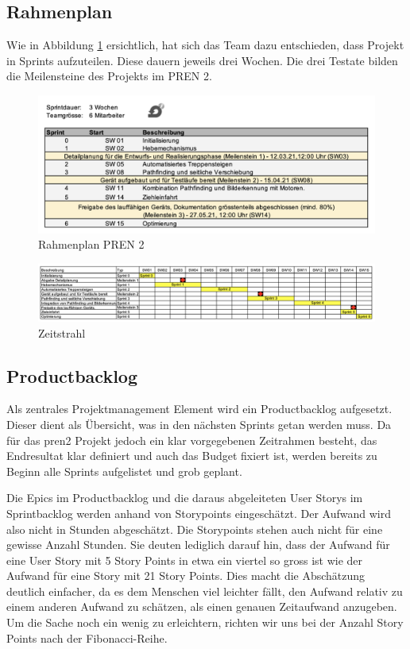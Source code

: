 \newpage
  
\subsection{Rahmenplan}
Wie in Abbildung \ref{fig:rahmenplan} ersichtlich, hat sich das Team dazu entschieden, dass Projekt in Sprints aufzuteilen. Diese dauern jeweils drei Wochen. Die drei Testate bilden die Meilensteine des Projekts im PREN 2.

\begin{figure}[H]
  \includegraphics[width=1.0\textwidth]{img/projektmanagement/Rahmenplan PREN2.png}
  \centering
  \caption{Rahmenplan PREN 2}
  \label{fig:rahmenplan}
\end{figure}

\begin{figure}[H]
  \includegraphics[width=1.0\textwidth]{img/projektmanagement/Zeitstrahl.png}
  \centering
  \caption{Zeitstrahl}
  \label{fig:sprint-backlog-1}
\end{figure}

\newpage

\subsection{Productbacklog}
Als zentrales Projektmanagement Element wird ein Productbacklog aufgesetzt. Dieser dient als Übersicht, was in den nächsten Sprints getan werden muss. Da für das \acrshort{pren2} Projekt jedoch ein klar vorgegebenen Zeitrahmen besteht, das Endresultat klar definiert und auch das Budget fixiert ist, werden bereits zu Beginn alle Sprints aufgelistet und grob geplant. 

Die Epics im Productbacklog und die daraus abgeleiteten User Storys im Sprintbacklog werden anhand von Storypoints eingeschätzt. Der Aufwand wird also nicht in Stunden abgeschätzt. Die Storypoints stehen auch nicht für eine gewisse Anzahl Stunden. Sie deuten lediglich darauf hin, dass der Aufwand für eine User Story mit 5 Story Points in etwa ein viertel so gross ist wie der Aufwand für eine Story mit 21 Story Points. Dies macht die Abschätzung deutlich einfacher, da es dem Menschen viel leichter fällt, den Aufwand relativ zu einem anderen Aufwand zu schätzen, als einen genauen Zeitaufwand anzugeben. Um die Sache noch ein wenig zu erleichtern, richten wir uns bei der Anzahl Story Points nach der Fibonacci-Reihe.

